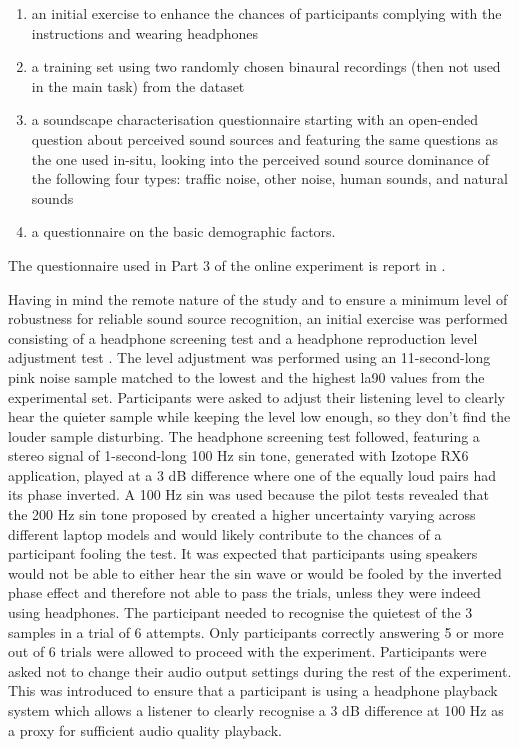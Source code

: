    \begin{enumerate}
     \item an initial exercise to enhance the chances of participants complying with the instructions and wearing headphones
     \item a training set using two randomly chosen binaural recordings (then not used in the main task) from the dataset
     \item a soundscape characterisation questionnaire starting with an open-ended question about perceived sound sources and featuring the same questions as the one used in-situ, looking into the perceived sound source dominance of the following four types: traffic noise, other noise, human sounds, and natural sounds
     \item a questionnaire on the basic demographic factors.
   \end{enumerate}

   The questionnaire used in Part 3 of the online experiment is report in .

   Having in mind the remote nature of the study and to ensure a minimum level of robustness for reliable sound source recognition, an initial exercise was performed consisting of a headphone screening test \citep{Woods2017Headphone} and a headphone reproduction level adjustment test \citep{Gontier2019Estimation}. The level adjustment was performed using an 11-second-long pink noise sample matched to the lowest and the highest \gls{la90} values from the experimental set. Participants were asked to adjust their listening level to clearly hear the quieter sample while keeping the level low enough, so they don't find the louder sample disturbing. The headphone screening test followed, featuring a stereo signal of 1-second-long 100 Hz sin tone, generated with Izotope RX6 application, played at a 3 dB difference where one of the equally loud pairs had its phase inverted. A 100 Hz sin was used because the pilot tests revealed that the 200 Hz sin tone proposed by \citet{Woods2017Headphone} created a higher uncertainty varying across different laptop models and would likely contribute to the chances of a participant fooling the test. It was expected that participants using speakers would not be able to either hear the sin wave or would be fooled by the inverted phase effect and therefore not able to pass the trials, unless they were indeed using headphones. The participant needed to recognise the quietest of the 3 samples in a trial of 6 attempts. Only participants correctly answering 5 or more out of 6 trials were allowed to proceed with the experiment. Participants were asked not to change their audio output settings during the rest of the experiment. This was introduced to ensure that a participant is using a headphone playback system which allows a listener to clearly recognise a 3 dB difference at 100 Hz as a proxy for sufficient audio quality playback.

